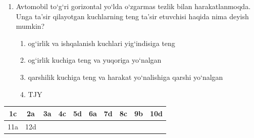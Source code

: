 \begin{enumerate}
\item Avtomobil to‘g‘ri gorizontal yo‘lda o‘zgarmas tezlik bilan harakatlanmoqda. 
Unga ta’sir qilayotgan kuchlarning teng ta’sir etuvchisi haqida nima deyish mumkin?

\begin{enumerate}[label=\Alph*)]

\item og‘irlik va ishqalanish kuchlari yig‘indisiga teng
\item og‘irlik kuchiga teng va yuqoriga yo‘nalgan
\item qarshilik kuchiga teng va harakat yo‘nalishiga qarshi yo‘nalgan
\item TJY
\end{enumerate}


\end{enumerate}

\begin{table}[ht]
\centering
\begin{tabular}{|c|c|c|c|c|c|c|c|c|c|}
\hline
1c & 2a & 3a & 4c & 5d & 6a & 7d & 8c & 9b & 10d \\ \hline
11a & 12d &  &  &  &  &  &  &  &  \\ \hline
\end{tabular}
\end{table}










